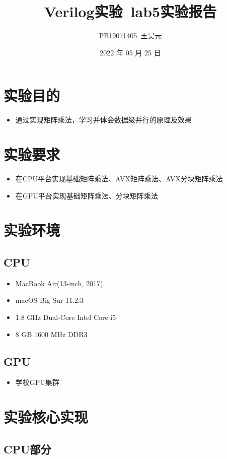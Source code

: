 \documentclass[UTF8]{article}
\title{Verilog实验\ lab5实验报告}
\author{PB19071405\ 王昊元}
\date{2022 年 05 月 25 日}
\begin{document}
    \maketitle
    \section{实验目的}
    \begin{itemize}
        \item 通过实现矩阵乘法，学习并体会数据级并行的原理及效果
    \end{itemize}
    \section{实验要求}
    \begin{itemize}
        \item 在CPU平台实现基础矩阵乘法、AVX矩阵乘法、AVX分块矩阵乘法
        \item 在GPU平台实现基础矩阵乘法、分块矩阵乘法
    \end{itemize}
    \section{实验环境}
    \subsection*{CPU}
    \begin{itemize}
        \item MacBook Air(13-inch, 2017)
        \item macOS Big Sur 11.2.3
        \item 1.8 GHz Dual-Core Intel Core i5
        \item 8 GB 1600 MHz DDR3
    \end{itemize}
    \subsection*{GPU}
    \begin{itemize}
        \item 学校GPU集群
    \end{itemize}
    \section{实验核心实现}
    \subsection{CPU部分}
\end{document}

